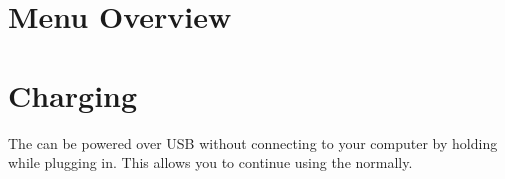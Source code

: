 \section{Menu Overview}
%

{
  {
     \section{Charging}
     The \dap{} can be powered over USB without connecting to your computer by holding \ActionStdUsbCharge{} while plugging in. This allows you to continue using the \dap{} normally.
  }
}


